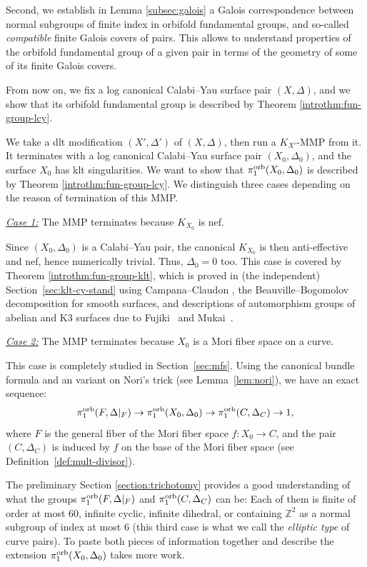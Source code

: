 \documentclass{amsart}
\theoremstyle{definition}
\theoremstyle{remark}
\numberwithin{equation}{section}
\begin{document}
Second, we establish in Lemma \ref{subsec:galois} a Galois correspondence between normal subgroups of finite index in orbifold fundamental groups, and so-called {\it compatible} finite Galois covers of pairs. This allows to understand properties of the orbifold fundamental group of a given pair in terms of the geometry of some of its finite Galois covers.

\medskip

From now on, we fix a log canonical Calabi--Yau surface pair $(X,\Delta)$, and we show that its orbifold fundamental group is described by Theorem \ref{introthm:fun-group-lcy}.

We take a dlt modification $(X',\Delta')$ of $(X,\Delta)$, then run a $K_{X'}$-MMP from it. It terminates with a log canonical Calabi--Yau surface pair $(X_0,\Delta_0)$, and the surface $X_0$ has klt singularities. We want to show that $\pi_1^{\rm orb}(X_0,\Delta_0)$ is described by Theorem \ref{introthm:fun-group-lcy}. We distinguish three cases depending on the reason of termination of this MMP.

\medskip

\noindent\underline{\textit{Case 1:}} The MMP terminates because $K_{X_0}$ is nef.

Since $(X_0,\Delta_0)$ is a Calabi--Yau pair, the canonical $K_{X_0}$ is then anti-effective and nef, hence numerically trivial. Thus, $\Delta_0=0$ too. This case is covered by Theorem \ref{introthm:fun-group-klt}, which is proved in (the independent) Section~\ref{sec:klt-cy-stand} using Campana--Claudon \cite{CC14}, the Beauville--Bogomolov decomposition for smooth surfaces, and descriptions of automorphism groups of abelian and K3 surfaces due to Fujiki~\cite{Fujiki88} and Mukai~\cite{Mukai88}.

\medskip

\noindent\underline{\textit{Case 2:}}
The MMP terminates because $X_0$ is a Mori fiber space on a curve.

This case is completely studied in Section~\ref{sec:mfs}.
Using the canonical bundle formula and an variant on Nori's trick (see Lemma~\ref{lem:nori}), we have an exact sequence:
$$\pi_1^{\rm orb}(F,\Delta|_F)\to \pi_1^{\rm orb}(X_0,\Delta_0)\to \pi_1^{\rm orb}(C,\Delta_C)\to 1,$$ 
where $F$ is the general fiber of the Mori fiber space $f:X_0\to C$, and the pair $(C,\Delta_C)$ is induced by $f$ on the base of the Mori fiber space (see Definition~\ref{def:mult-divisor}).

The preliminary Section \ref{section:trichotomy} provides a good understanding of what the groups $\pi_1^{\rm orb}(F,\Delta|_F)$ and $\pi_1^{\rm orb}(C,\Delta_C)$ can be: Each of them is finite of order at most $60$, infinite cyclic, infinite dihedral, or containing $\mathbb{Z}^2$ as a normal subgroup of index at most $6$ (this third case is what we call the {\it elliptic type} of curve pairs). 
To paste both pieces of information together and describe the extension $\pi_1^{\rm orb}(X_0,\Delta_0)$ takes more work.
\end{document}
